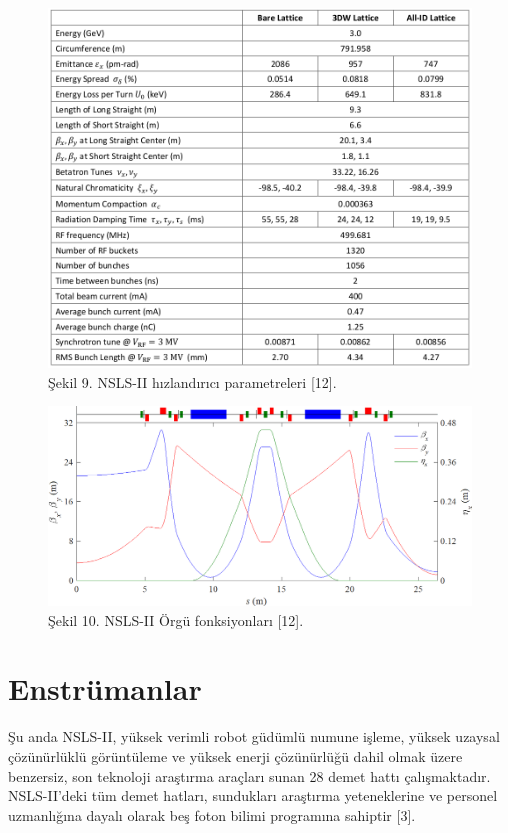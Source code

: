 \documentclass{article}
\begin{document}
	
	\newpage

	
	\begin{figure}[h!]
 \centering
\includegraphics[width=15cm]{nsls parameter.png}
\caption*{Şekil 9. NSLS-II hızlandırıcı parametreleri [12].}
	\end{figure}
	
		\begin{figure}[h!]
 \centering
\includegraphics[width=12cm]{latticefunction.png}
\caption*{Şekil 10. NSLS-II Örgü fonksiyonları [12].}
	\end{figure}
	
	
	\newpage
\section{Enstrümanlar}	

Şu anda NSLS-II, yüksek verimli robot güdümlü numune işleme, yüksek uzaysal çözünürlüklü görüntüleme ve yüksek enerji çözünürlüğü dahil olmak üzere benzersiz, son teknoloji araştırma araçları sunan 28 demet hattı çalışmaktadır. NSLS-II'deki tüm demet hatları, sundukları araştırma yeteneklerine ve personel uzmanlığına dayalı olarak beş foton bilimi programına sahiptir [3].
\end{document}
